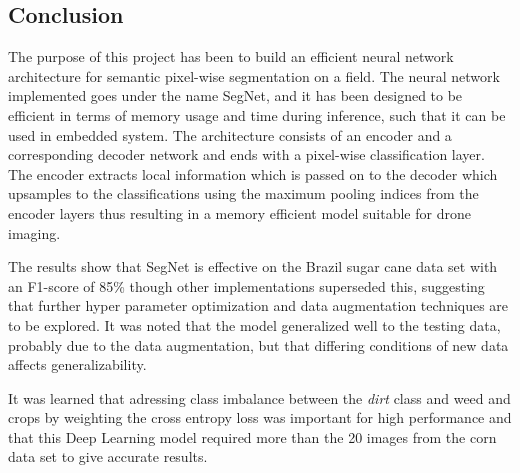 \documentclass{article}
\begin{document}
\subsection{Conclusion}
The purpose of this project has been to build an efficient neural network architecture for semantic pixel-wise segmentation on a field. 
The neural network implemented goes under the name SegNet, and it has been designed to be efficient in terms of memory usage and time during inference, such that it can be used in embedded system.
The architecture consists of an encoder and a corresponding decoder network and ends with a pixel-wise classification layer. 
The encoder extracts local information which is passed on to the decoder which upsamples to the classifications using the maximum pooling indices from the encoder layers thus resulting in a memory efficient model suitable for drone imaging.

The results show that SegNet is effective on the Brazil sugar cane data set with an F1-score of 85\% though other implementations superseded this, suggesting that further hyper parameter optimization and  data augmentation techniques are to be explored. It was noted that the model generalized well to the testing data, probably due to the data augmentation, but that differing conditions of new data affects generalizability.


It was learned that adressing class imbalance between the \textit{dirt} class and weed and crops by weighting the cross entropy loss was important for high performance and that this Deep Learning model required more than the 20 images from the corn data set to give accurate results.
\end{document}
